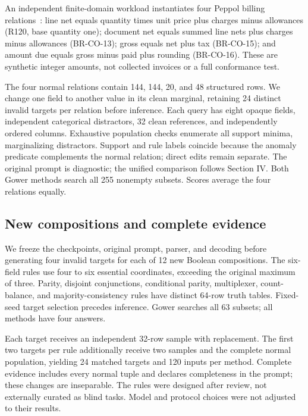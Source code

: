 \documentclass[conference]{IEEEtran}
\begin{document}
An independent finite-domain workload instantiates four Peppol billing relations~\cite{peppol2026billing}: line net equals quantity times unit price plus charges minus allowances (R120, base quantity one); document net equals summed line nets plus charges minus allowances (BR-CO-13); gross equals net plus tax (BR-CO-15); and amount due equals gross minus paid plus rounding (BR-CO-16). These are synthetic integer amounts, not collected invoices or a full conformance test.

The four normal relations contain 144, 144, 20, and 48 structured rows. We change one field to another value in its clean marginal, retaining 24 distinct invalid targets per relation before inference. Each query has eight opaque fields, independent categorical distractors, 32 clean references, and independently ordered columns. Exhaustive population checks enumerate all support minima, marginalizing distractors. Support and rule labels coincide because the anomaly predicate complements the normal relation; direct edits remain separate. The original prompt is diagnostic; the unified comparison follows Section IV. Both Gower methods search all 255 nonempty subsets. Scores average the four relations equally.



\subsection{New compositions and complete evidence}

We freeze the checkpoints, original prompt, parser, and decoding before generating four invalid targets for each of 12 new Boolean compositions. The six-field rules use four to six essential coordinates, exceeding the original maximum of three. Parity, disjoint conjunctions, conditional parity, multiplexer, count-balance, and majority-consistency rules have distinct 64-row truth tables. Fixed-seed target selection precedes inference. Gower searches all 63 subsets; all methods have four answers.

Each target receives an independent 32-row sample with replacement. The first two targets per rule additionally receive two samples and the complete normal population, yielding 24 matched targets and 120 inputs per method. Complete evidence includes every normal tuple and declares completeness in the prompt; these changes are inseparable. The rules were designed after review, not externally curated as blind tasks. Model and protocol choices were not adjusted to their results.
\end{document}
